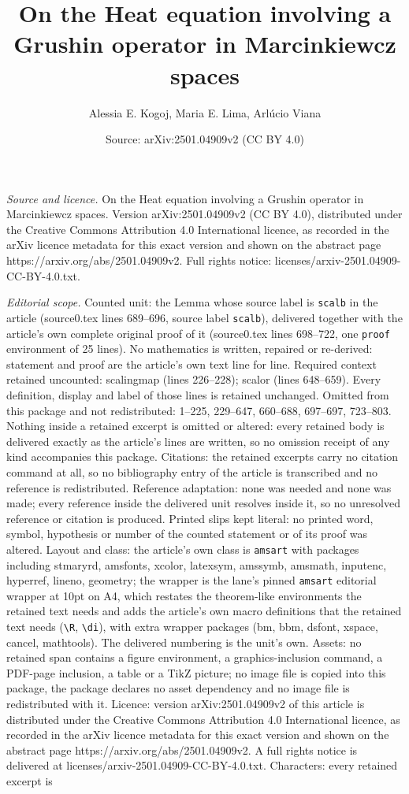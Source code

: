 \documentclass[10pt,a4paper]{amsart}
\title[On the Heat equation involving a Grushin operator in Marcink]{On the Heat equation involving a Grushin operator in Marcinkiewcz spaces}
\author{Alessia E. Kogoj, Maria E. Lima, Arl\'ucio Viana}
\date{Source: arXiv:2501.04909v2 (CC BY 4.0)}
\begin{document}
\maketitle

\noindent\emph{Source and licence.} On the Heat equation involving a Grushin operator in Marcinkiewcz spaces. Version arXiv:2501.04909v2 (CC BY 4.0), distributed under the Creative Commons Attribution 4.0 International licence, as recorded in the arXiv licence metadata for this exact version and shown on the abstract page https://arxiv.org/abs/2501.04909v2. Full rights notice: licenses/arxiv-2501.04909-CC-BY-4.0.txt.\par\smallskip

\noindent\textit{Editorial scope.} Counted unit: the Lemma whose source label is \texttt{scalb} in the article (source0.tex lines 689--696, source label \texttt{scalb}), delivered together with the article's own complete original proof of it (source0.tex lines 698--722, one \texttt{proof} environment of 25 lines). No mathematics is written, repaired or re-derived: statement and proof are the article's own text line for line. Required context retained uncounted: scalingmap (lines 226--228); scalor (lines 648--659). Every definition, display and label of those lines is retained unchanged. Omitted from this package and not redistributed: 1--225, 229--647, 660--688, 697--697, 723--803. Nothing inside a retained excerpt is omitted or altered: every retained body is delivered exactly as the article's lines are written, so no omission receipt of any kind accompanies this package. Citations: the retained excerpts carry no citation command at all, so no bibliography entry of the article is transcribed and no reference is redistributed. Reference adaptation: none was needed and none was made; every reference inside the delivered unit resolves inside it, so no unresolved reference or citation is produced. Printed slips kept literal: no printed word, symbol, hypothesis or number of the counted statement or of its proof was altered. Layout and class: the article's own class is \texttt{amsart} with packages including stmaryrd, amsfonts, xcolor, latexsym, amssymb, amsmath, inputenc, hyperref, lineno, geometry; the wrapper is the lane's pinned \texttt{amsart} editorial wrapper at 10pt on A4, which restates the theorem-like environments the retained text needs and adds the article's own macro definitions that the retained text needs (\texttt{\textbackslash R}, \texttt{\textbackslash di}), with extra wrapper packages (bm, bbm, dsfont, xspace, cancel, mathtools). The delivered numbering is the unit's own. Assets: no retained span contains a figure environment, a graphics-inclusion command, a PDF-page inclusion, a table or a TikZ picture; no image file is copied into this package, the package declares no asset dependency and no image file is redistributed with it. Licence: version arXiv:2501.04909v2 of this article is distributed under the Creative Commons Attribution 4.0 International licence, as recorded in the arXiv licence metadata for this exact version and shown on the abstract page https://arxiv.org/abs/2501.04909v2. A full rights notice is delivered at licenses/arxiv-2501.04909-CC-BY-4.0.txt. Characters: every retained excerpt is 
\end{document}
